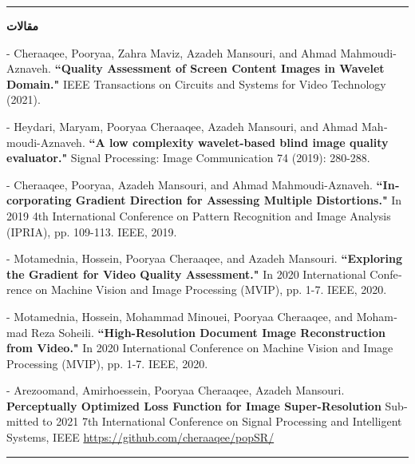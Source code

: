 \documentclass{letter}
\begin{document}
\noindent \rule{18cm}{3pt}

\begin{Large}
	\textbf{مقالات}\hskip 13.5cm 
\end{Large}

\begin{latin}
	- Cheraaqee, Pooryaa, Zahra Maviz, Azadeh Mansouri, and Ahmad Mahmoudi-Aznaveh. \textbf{``Quality Assessment of Screen Content Images in Wavelet Domain."} IEEE Transactions on Circuits and Systems for Video Technology (2021).

	- Heydari, Maryam, Pooryaa Cheraaqee, Azadeh Mansouri, and Ahmad Mahmoudi-Aznaveh. \textbf{``A low complexity wavelet-based blind image quality evaluator."} Signal Processing: Image Communication 74 (2019): 280-288.

	- Cheraaqee, Pooryaa, Azadeh Mansouri, and Ahmad Mahmoudi-Aznaveh. \textbf{``Incorporating Gradient Direction for Assessing Multiple Distortions."} In 2019 4th International Conference on Pattern Recognition and Image Analysis (IPRIA), pp. 109-113. IEEE, 2019.

	- Motamednia, Hossein, Pooryaa Cheraaqee, and Azadeh Mansouri. \textbf{``Exploring the Gradient for Video Quality Assessment."} In 2020 International Conference on Machine Vision and Image Processing (MVIP), pp. 1-7. IEEE, 2020.

	- Motamednia, Hossein, Mohammad Minouei, Pooryaa Cheraaqee, and Mohammad Reza Soheili. \textbf{``High-Resolution Document Image Reconstruction from Video."} In 2020 International Conference on Machine Vision and Image Processing (MVIP), pp. 1-7. IEEE, 2020.

	- Arezoomand, Amirhoessein, Pooryaa Cheraaqee, Azadeh Mansouri. \textbf{Perceptually Optimized Loss Function for Image Super-Resolution} Submitted to 2021 7th International Conference on Signal Processing and Intelligent Systems, IEEE \href{https://github.com/cheraaqee/popSR/}{https://github.com/cheraaqee/popSR/}
\end{latin}
\noindent \rule{18cm}{3pt}
\end{document}
